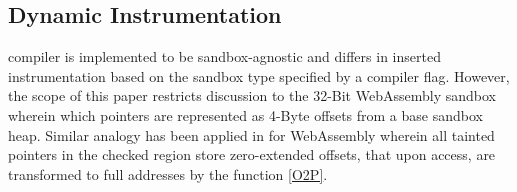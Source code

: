 %
%

\subsection{\systemname Dynamic Instrumentation}
\systemname compiler is implemented to be sandbox-agnostic and differs in inserted instrumentation based on the sandbox type specified by a compiler flag. However, the scope of this paper restricts discussion to the 32-Bit WebAssembly sandbox wherein which pointers are represented as 4-Byte offsets from a base sandbox heap. Similar analogy has been applied in \systemname for WebAssembly wherein all tainted pointers in the checked region store zero-extended offsets, that upon access, are transformed to full addresses by the function \ref{O2P}.   
